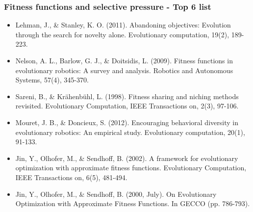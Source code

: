 \documentclass[8pt]{beamer}
\begin{document}
\begin{frame}
\frametitle{Fitness functions and selective pressure - Top 6 list}
\begin{itemize}
	\item Lehman, J., \& Stanley, K. O. (2011). Abandoning objectives: Evolution through the search for novelty alone. Evolutionary computation, 19(2), 189-223.
	\item Nelson, A. L., Barlow, G. J., \& Doitsidis, L. (2009). Fitness functions in evolutionary robotics: A survey and analysis. Robotics and Autonomous Systems, 57(4), 345-370.
	\item Sareni, B., \& Krähenbühl, L. (1998). Fitness sharing and niching methods revisited. Evolutionary Computation, IEEE Transactions on, 2(3), 97-106.
	\item Mouret, J. B., \& Doncieux, S. (2012). Encouraging behavioral diversity in evolutionary robotics: An empirical study. Evolutionary computation, 20(1), 91-133.
	\item Jin, Y., Olhofer, M., \& Sendhoff, B. (2002). A framework for evolutionary optimization with approximate fitness functions. Evolutionary Computation, IEEE Transactions on, 6(5), 481-494.
	\item Jin, Y., Olhofer, M., \& Sendhoff, B. (2000, July). On Evolutionary Optimization with Approximate Fitness Functions. In GECCO (pp. 786-793).
\end{itemize}
\end{frame}
\end{document}
